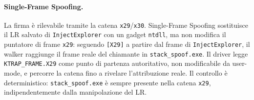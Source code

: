 \paragraph{Single-Frame Spoofing.}
La firma è rilevabile tramite la catena \texttt{x29}/\texttt{x30}. Single-Frame
Spoofing sostituisce il LR salvato di \texttt{InjectExplorer} con un gadget
\texttt{ntdll}, ma non modifica il puntatore di frame \texttt{x29}: seguendo
\texttt{[X29]} a partire dal frame di \texttt{InjectExplorer}, il walker
raggiunge il frame reale del chiamante in \texttt{stack\_spoof.exe}. Il driver
legge \texttt{KTRAP\_FRAME.X29} come punto di partenza autoritativo, non
modificabile da user-mode, e percorre la catena fino a rivelare l'attribuzione
reale. Il controllo è deterministico: \texttt{stack\_spoof.exe} è sempre
presente nella catena \texttt{x29}, indipendentemente dalla manipolazione del LR.
